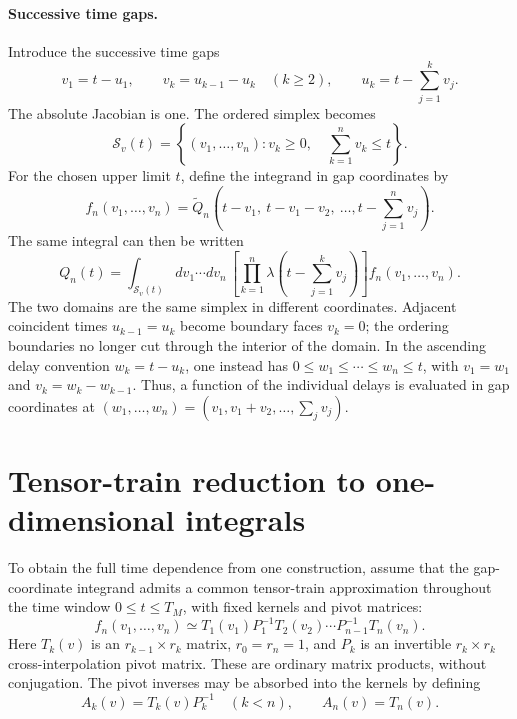 \documentclass[11pt]{article}
\begin{document}
\paragraph{Successive time gaps.}
Introduce the successive time gaps
\begin{equation}
    v_1=t-u_1,\qquad v_k=u_{k-1}-u_k\quad(k\geq2),
    \qquad u_k=t-\sum_{j=1}^k v_j.
    \label{eq:gaps}
\end{equation}
The absolute Jacobian is one. The ordered simplex becomes
\begin{equation}
    \mathcal S_v(t)=\left\{(v_1,\ldots,v_n):
        v_k\geq0,\quad\sum_{k=1}^n v_k\leq t\right\}.
    \label{eq:gap_simplex}
\end{equation}
For the chosen upper limit $t$, define the integrand in gap coordinates by
\begin{equation}
    f_n(v_1,\ldots,v_n)=
    \widetilde Q_n\left(t-v_1,\ t-v_1-v_2,\ \ldots,
                       t-\sum_{j=1}^n v_j\right).
    \label{eq:gap_integrand}
\end{equation}
The same integral can then be written
\begin{equation}
    Q_n(t)=\int_{\mathcal S_v(t)}dv_1\cdots dv_n\,
      \left[\prod_{k=1}^n
      \lambda\left(t-\sum_{j=1}^k v_j\right)\right]
      f_n(v_1,\ldots,v_n).
    \label{eq:gap_integral}
\end{equation}
The two domains are the same simplex in different coordinates.
Adjacent coincident times $u_{k-1}=u_k$ become boundary faces $v_k=0$;
the ordering boundaries no longer cut through the interior of the domain.
In the ascending delay convention $w_k=t-u_k$, one instead has
$0\leq w_1\leq\cdots\leq w_n\leq t$, with
$v_1=w_1$ and $v_k=w_k-w_{k-1}$.
Thus, a function of the individual delays is evaluated in gap coordinates
at $(w_1,\ldots,w_n)=(v_1,v_1+v_2,\ldots,\sum_j v_j)$.

\section{Tensor-train reduction to one-dimensional integrals}

To obtain the full time dependence from one construction, assume that
the gap-coordinate integrand admits a common tensor-train approximation
throughout the time window $0\leq t\leq T_M$, with fixed kernels and
pivot matrices:
\begin{equation}
    f_n(v_1,\ldots,v_n)
    \simeq T_1(v_1)P_1^{-1}T_2(v_2)\cdots
           P_{n-1}^{-1}T_n(v_n).
    \label{eq:tt}
\end{equation}
Here $T_k(v)$ is an $r_{k-1}\times r_k$ matrix, $r_0=r_n=1$,
and $P_k$ is an invertible $r_k\times r_k$ cross-interpolation pivot
matrix. These are ordinary matrix products, without conjugation.
The pivot inverses may be absorbed into the kernels by defining
\begin{equation}
    A_k(v)=T_k(v)P_k^{-1}\quad(k<n),\qquad A_n(v)=T_n(v).
\end{equation}
\end{document}
